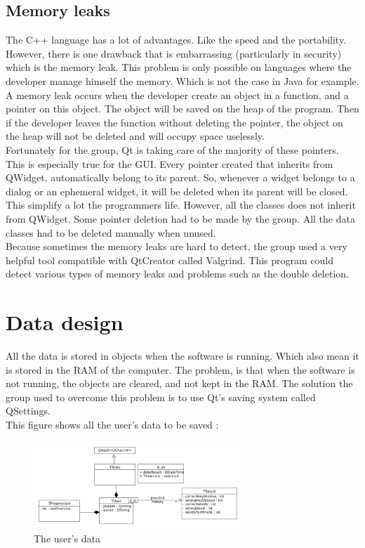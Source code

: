 \section{Memory leaks}
The C++ language has a lot of advantages. Like the speed and the portability. However, there is one drawback that is embarrassing (particularly in security) which is the memory leak. This problem is only possible on languages where the developer manage himself the memory. Which is not the case in Java for example. A memory leak occurs when the developer create an object  in a function, and a pointer on this object. The object will be saved on the heap of the program. Then if the developer leaves the function without deleting the pointer, the object on the heap will not be deleted and will occupy space uselessly. \\
Fortunately for the group, Qt is taking care of the majority of these pointers. This is especially true for the GUI. Every pointer created that inherits from QWidget, automatically belong to its parent. So, whenever a widget belongs to a dialog or an ephemeral widget, it will be deleted when its parent will be closed. This simplify a lot the programmers life. However, all the classes does not inherit from QWidget. Some pointer deletion had to be made by the group. All the data classes had to be deleted manually when unused.\\
Because sometimes the memory leaks are hard to detect, the group used a very helpful tool compatible with QtCreator called Valgrind. This program could detect various types of memory leaks and problems such as the double deletion.

\chapter{Data design}
All the data is stored in objects when the software is running. Which also mean it is stored in the RAM of the computer.
The problem, is that when the software is not running, the objects are cleared, and not kept in the RAM. The solution the group used to overcome this problem is to use Qt's saving system called QSettings.\\
This figure shows all the user's data to be saved :

\begin{figure}[H]
	\centering
	\includegraphics[width=0.7\textwidth]{images/diagram-data.png}
	 \caption{The user's data}
	 \label{diagram-data}
\end{figure}

